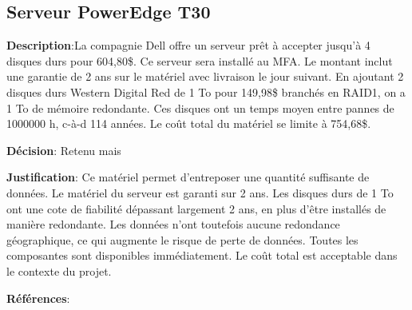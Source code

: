 

\subsection{Serveur PowerEdge T30}
\label{s:archiver_conc1}

\textbf{Description}:La compagnie Dell offre un serveur prêt à accepter jusqu’à 4 disques durs pour 604,80\$. Ce serveur sera installé au MFA. Le montant inclut une garantie de 2 ans sur le matériel avec livraison le jour suivant. En ajoutant 2 disques durs Western Digital Red de 1 To pour 149,98\$ branchés en RAID1, on a 1 To de mémoire redondante. Ces disques ont un temps moyen entre pannes de 1000000 h, c-à-d 114 années.  Le coût total du matériel se limite à 754,68\$. 

\textbf{Décision}: Retenu mais 

\textbf{Justification}: Ce matériel permet d’entreposer une quantité suffisante de données. Le matériel du serveur est garanti sur 2 ans. Les disques durs de 1 To ont une cote de fiabilité dépassant largement 2 ans, en plus d’être installés de manière redondante. Les données n’ont toutefois aucune redondance géographique, ce qui augmente le risque de perte de données. Toutes les composantes sont disponibles immédiatement. Le coût total est acceptable dans le contexte du projet.

\textbf{Références}:

\cite{dellT30, amazonWDred, wdRedSpec, wiki_raid1}


